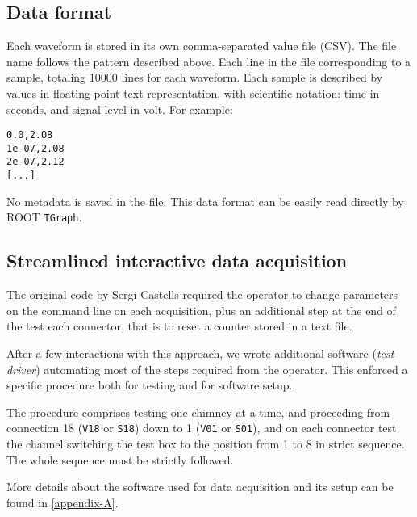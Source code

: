 \subsection{Data format}
\label{ssec:software:dataformats}

Each waveform is stored in its own comma-separated value file (CSV). The file name follows the pattern described above. Each line in the file corresponding to a sample, totaling 10000 lines for each waveform. Each sample is described by values in floating point text representation, with scientific notation: time in seconds, and signal level in volt. For example:

\begin{verbatim}
0.0,2.08
1e-07,2.08
2e-07,2.12
[...]
\end{verbatim}

No metadata is saved in the file. This data format can be easily read directly by ROOT \texttt{TGraph}.



\subsection{Streamlined interactive data acquisition}
\label{ssec:software:streamlinedDAQ}

The original code by Sergi Castells required the operator to change
parameters on the command line on each acquisition, plus an additional step at the end of the test each connector, that is to reset a counter stored in a text file.

After a few interactions with this approach, we wrote additional
software (\emph{test driver}) automating most of the steps required from the operator. This enforced a specific procedure both for testing and for software setup.

The procedure comprises testing one chimney at a time, and proceeding from connection 18 (\texttt{V18} or \texttt{S18}) down to 1 (\texttt{V01} or \texttt{S01}), and on each connector test the channel switching the test box to the position from 1 to 8 in strict sequence. The whole sequence must be strictly followed.

More details about the software used for data acquisition and its setup can be found in \ref{appendix-A}.

